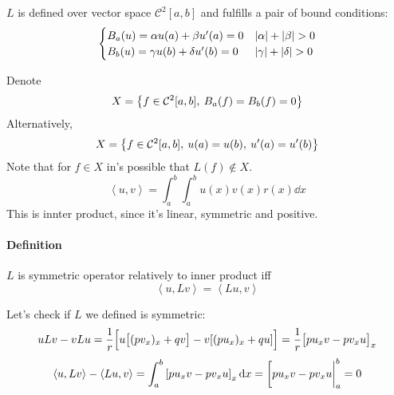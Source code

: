 $L$ is defined over vector space $\mathcal{C}^2[a,b]$ and fulfills a pair of bound conditions:
$$\begin{cases}
B_a(u) = \alpha u(a) + \beta u'(a) = 0& \abs{\alpha} + \abs{\beta}>0\\
B_b(u)  = \gamma u(b) + \delta u'(b) = 0& \abs{\gamma} + \abs{\delta}>0
\end{cases}$$

Denote
$$X = \qty{ f\in \mathcal{C}^2[a,b], \: B_a(f)=B_b(f) = 0 }$$
Alternatively,
$$X = \qty{ f\in \mathcal{C}^2[a,b], \:  u(a)=u(b), \: u'(a)=u'(b) }$$
Note that for $f\in X$ in's possible that $L(f) \notin X$.
$$\left\langle u,v\right\rangle = \int_a^b \int_a^b u(x)v(x) r(x) \dd{x} $$
This is innter product, since it's linear, symmetric and positive.
\paragraph{Definition} $L$ is symmetric operator relatively to inner product iff
$$\left\langle u,Lv\right\rangle =\left\langle Lu,v\right\rangle $$

Let's check if $L$ we defined is symmetric:
$$uLv-vLu = \frac{1}{r}\qty\Big[u\qty\big[(pv_x)_x + qv ]- v\qty[(pu_x)_x + qu]] =\frac{1}{r}\qty\big[ pu_xv - pv_x u]_x$$
$$\left\langle u,Lv\right\rangle - \left\langle Lu,v\right\rangle = \int_a^b \qty[ pu_xv - pv_x u]_x \dd{x} = \eval[pu_xv - pv_x u|_{a}^{b} = 0$$
